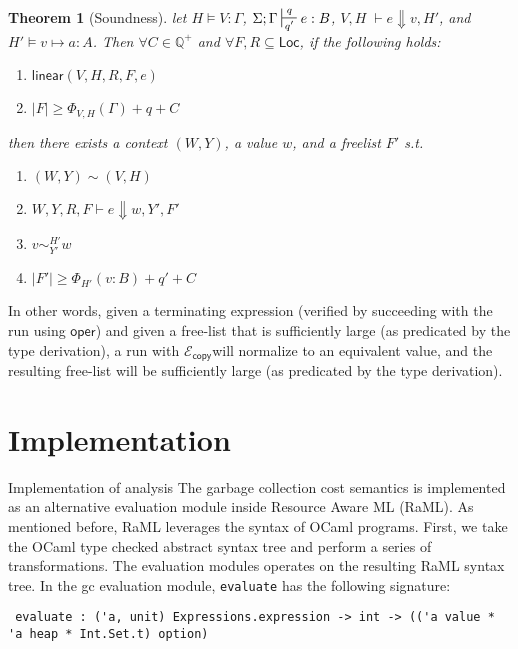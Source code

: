 \documentclass{easychair}
\newtheorem{theorem}{Theorem}
\newcommand{\ms}[1]{\ensuremath{\mathsf{#1}}}
\newcommand{\wfc}[5]{\mathsf{linear}(#1,#2,#3,#4,#5)}
\newcommand{\veq}[4]{#3 \sim^{#1}_{#2} #4}
\newcommand{\ctxeq}[2]{(#1) \sim (#2)}
\newcommand{\jan}[1]{{\color{red} #1}}
\newcommand{\copySem}{\ensuremath{\mathcal{E}_{\ms{copy}}}}
\theoremstyle{definition}
\begin{document}
\begin{theorem}[Soundness]
\label{itm:soundness} let $H \vDash V : \Gamma$, $\Sigma; \Gamma \sststile{q'}{q} e : B$,
$V,H \; \vdash e \Downarrow v, H'$, and $H' \vDash v \mapsto a : A$.
Then $\forall C \in \mathbb{Q}^{+}$ and $\forall F,R \subseteq \ms{Loc}$,
if the following holds:
\begin{enumerate} 
\item $\wfc{V}{H}{R}{F}{e}$
\item $|F| \ge \Phi_{V,H}(\Gamma) + q + C$ 
\end{enumerate}
then there exists a context $(W,Y)$, a value $w$, and a freelist $F'$ s.t.
\begin{enumerate}
	\item $\ctxeq{W,Y}{V,H}$
  \item $W,Y,R,F \vdash e \Downarrow w, Y', F'$
	\item $\veq{H'}{Y'}{v}{w}$
  \item $|F'| \ge \Phi_{H'}(v:B) + q' + C$
\end{enumerate}
\end{theorem}

In other words, given a terminating expression (verified by succeeding with the run using \ms{oper})
and given a free-list that is sufficiently large (as predicated by the type derivation), 
a run with \copySem will normalize to an equivalent value, and the resulting free-list 
will be sufficiently large (as predicated by the type derivation).






\section{Implementation}
\label{sect:implementation}

\jan{Implementation of analysis}
The garbage collection cost semantics is implemented as an alternative evaluation module inside
Resource Aware ML (RaML). As mentioned before, RaML leverages the syntax of OCaml programs. 
First, we take the OCaml type checked abstract syntax tree and perform a series of transformations. 
The evaluation modules operates on the resulting RaML syntax tree. 
In the gc evaluation module, \texttt{evaluate} has the following signature:

\begin{verbatim}
 evaluate : ('a, unit) Expressions.expression -> int -> (('a value * 'a heap * Int.Set.t) option) 
\end{verbatim}
\end{document}
